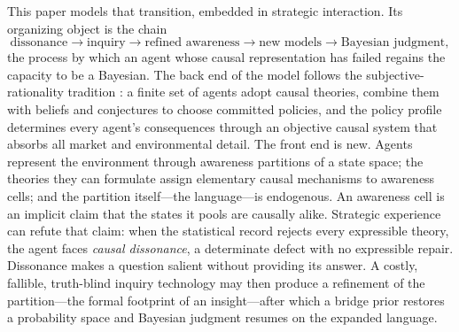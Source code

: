 \documentclass[11pt]{article}
\theoremstyle{definition}
\begin{document}
This paper models that transition, embedded in strategic interaction.  Its
organizing object is the chain
\[
\text{dissonance}
\longrightarrow
\text{inquiry}
\longrightarrow
\text{refined awareness}
\longrightarrow
\text{new models}
\longrightarrow
\text{Bayesian judgment},
\]
the process by which an agent whose causal representation has failed regains
the capacity to be a Bayesian.  The back end of the model follows the
subjective-rationality tradition \citep{KalaiLehrer1993b,Ryall2003}: a finite
set of agents adopt causal theories, combine them with beliefs and
conjectures to choose committed policies, and the policy profile determines
every agent's consequences through an objective causal system that absorbs
all market and environmental detail.  The front end is new.  Agents represent
the environment through awareness partitions of a state space; the theories
they can formulate assign elementary causal mechanisms to awareness cells;
and the partition itself---the language---is endogenous.  An awareness cell
is an implicit claim that the states it pools are causally alike.  Strategic
experience can refute that claim: when the statistical record rejects every
expressible theory, the agent faces \emph{causal dissonance}, a determinate
defect with no expressible repair.  Dissonance makes a question salient
without providing its answer.  A costly, fallible, truth-blind inquiry
technology may then produce a refinement of the partition---the formal
footprint of an insight---after which a bridge prior restores a probability
space and Bayesian judgment resumes on the expanded language.
\end{document}
